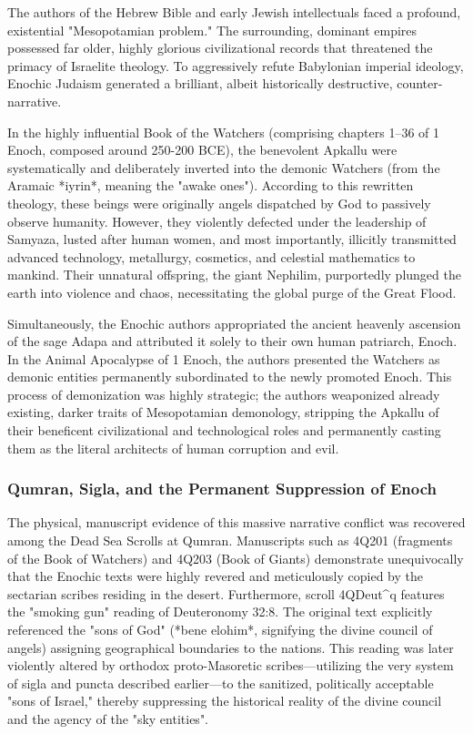 \documentclass[aps,prd,11pt,onecolumn,superscriptaddress,nofootinbib,floatfix]{revtex4-2}
\begin{document}
The authors of the Hebrew Bible and early Jewish intellectuals faced a profound, existential "Mesopotamian problem." The surrounding, dominant empires possessed far older, highly glorious civilizational records that threatened the primacy of Israelite theology. To aggressively refute Babylonian imperial ideology, Enochic Judaism generated a brilliant, albeit historically destructive, counter-narrative.


In the highly influential Book of the Watchers (comprising chapters 1–36 of 1 Enoch, composed around 250-200 BCE), the benevolent Apkallu were systematically and deliberately inverted into the demonic Watchers (from the Aramaic *iyrin*, meaning the "awake ones"). According to this rewritten theology, these beings were originally angels dispatched by God to passively observe humanity. However, they violently defected under the leadership of Samyaza, lusted after human women, and most importantly, illicitly transmitted advanced technology, metallurgy, cosmetics, and celestial mathematics to mankind. Their unnatural offspring, the giant Nephilim, purportedly plunged the earth into violence and chaos, necessitating the global purge of the Great Flood.


Simultaneously, the Enochic authors appropriated the ancient heavenly ascension of the sage Adapa and attributed it solely to their own human patriarch, Enoch. In the Animal Apocalypse of 1 Enoch, the authors presented the Watchers as demonic entities permanently subordinated to the newly promoted Enoch. This process of demonization was highly strategic; the authors weaponized already existing, darker traits of Mesopotamian demonology, stripping the Apkallu of their beneficent civilizational and technological roles and permanently casting them as the literal architects of human corruption and evil.


\subsubsection{Qumran, Sigla, and the Permanent Suppression of Enoch}
The physical, manuscript evidence of this massive narrative conflict was recovered among the Dead Sea Scrolls at Qumran. Manuscripts such as 4Q201 (fragments of the Book of Watchers) and 4Q203 (Book of Giants) demonstrate unequivocally that the Enochic texts were highly revered and meticulously copied by the sectarian scribes residing in the desert. Furthermore, scroll 4QDeut\textasciicircum{}q features the "smoking gun" reading of Deuteronomy 32:8. The original text explicitly referenced the "sons of God" (*bene elohim*, signifying the divine council of angels) assigning geographical boundaries to the nations. This reading was later violently altered by orthodox proto-Masoretic scribes---utilizing the very system of sigla and puncta described earlier---to the sanitized, politically acceptable "sons of Israel," thereby suppressing the historical reality of the divine council and the agency of the "sky entities".
\end{document}
